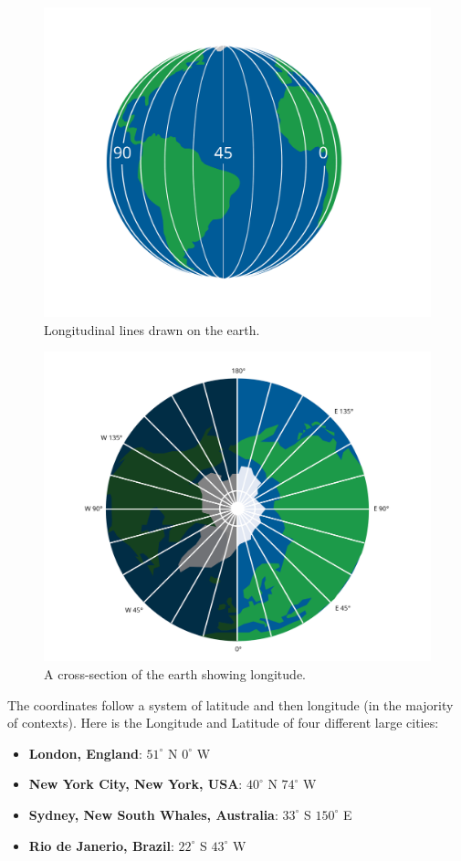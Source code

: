 \begin{figure}[htbp]
    \centering
    \includegraphics[width=.75\textwidth]{long.png}
    \caption{Longitudinal lines drawn on the earth.}
    \label{fig:longitude}
\end{figure}
\begin{figure}[htbp]
  \centering
  \includegraphics[width=.75\textwidth]{longExplanation.png}
    \caption{A cross-section of the earth showing longitude.}
    \label{fig:longExplanation}
\end{figure}
The coordinates follow a system of latitude and then longitude (in the majority of contexts). Here is the Longitude and Latitude of four different large cities:
\begin{itemize}
  \item \textbf{London, England}: $51^\circ$ N $0^\circ$ W
  \item \textbf{New York City, New York, USA}: $40^\circ$ N $74^\circ$ W
  \item \textbf{Sydney, New South Whales, Australia}: $33^\circ$ S $150^\circ$ E
  \item \textbf{Rio de Janerio, Brazil}: $22^\circ$ S $43^\circ$ W
\end{itemize}

